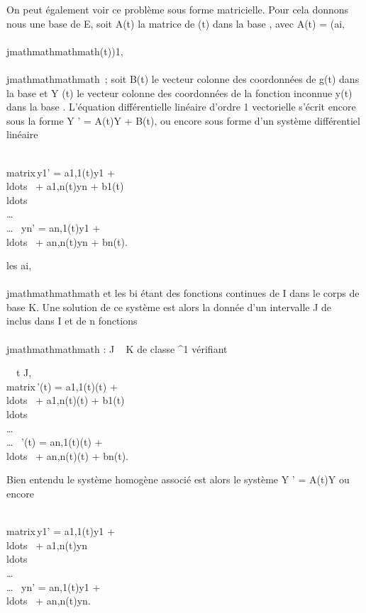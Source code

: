 On peut également voir ce problème sous forme matricielle. Pour cela
donnons nous  une base de E, soit A(t) la matrice de \ell(t) dans la base
, avec A(t) = (ai,\\\\jmathmathmathmath(t))1\leqi,\\\\jmathmathmathmath\leqn~; soit B(t) le
vecteur colonne des coordonnées de g(t) dans la base  et Y (t) le
vecteur colonne des coordonnées de la fonction inconnue y(t) dans la
base . L'équation différentielle linéaire d'ordre 1 vectorielle s'écrit
encore sous la forme Y ' = A(t)Y + B(t), ou encore sous forme d'un
système différentiel linéaire

\left
\\matrix\,y1'
= a1,1(t)y1 +
\\ldots~ +
a1,n(t)yn + b1(t) \cr
\\ldots\\\ldots\\\ldots~
\cr yn' = an,1(t)y1 +
\\ldots~ +
an,n(t)yn + bn(t)\right .

les ai,\\\\jmathmathmathmath et les bi étant des fonctions continues de
I dans le corps de base K. Une solution de ce système est alors la
donnée d'un intervalle J de ~ inclus dans I et de n fonctions
\phi\\\\jmathmathmathmath : J \rightarrow~ K de classe ^1 vérifiant

\forall~~t \in J,\quad
\left
\\matrix\,'(t)
= a1,1(t)(t) +
\\ldots~ +
a1,n(t)\phin(t) + b1(t) \cr
\\ldots\\\ldots\\\ldots~
\cr \phin'(t) = an,1(t)(t) +
\\ldots~ +
an,n(t)\phin(t) +
bn(t)\right .

Bien entendu le système homogène associé est alors le système Y ' =
A(t)Y ou encore

\left
\\matrix\,y1'
= a1,1(t)y1 +
\\ldots~ +
a1,n(t)yn \cr
\\ldots\\\ldots\\\ldots~
\cr yn' = an,1(t)y1 +
\\ldots~ +
an,n(t)yn\right .


